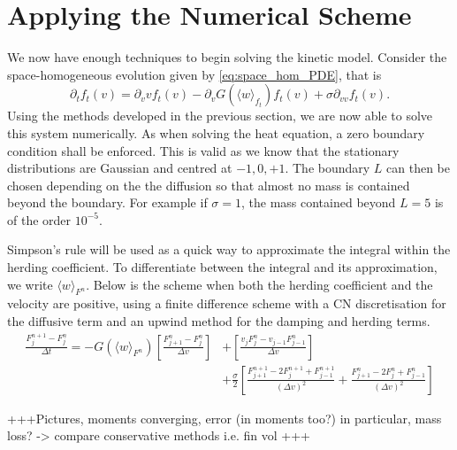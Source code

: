\documentclass[11pt, a4paper, draft]{article}
\begin{document}
		\section{Applying the Numerical Scheme}
			We now have enough techniques to begin solving the kinetic model. Consider the space-homogeneous evolution given by \eqref{eq:space_hom_PDE}, that is
			\begin{equation}
				\partial_t f_t(v) = \partial_v vf_t(v) - \partial_v G(\langle w \rangle_{f_t})f_t(v) + \sigma \partial_{vv} f_t(v).
			\end{equation}
            Using the methods developed in the previous section, we are now able to solve this system numerically. As when solving the heat equation, a zero boundary condition shall be enforced. This is valid as we know that the stationary distributions are Gaussian and centred at $-1,0,+1$. The boundary $L$ can then be chosen depending on the the diffusion so that almost no mass is contained beyond the boundary. For example if $\sigma = 1$, the mass contained beyond $L=5$ is of the order $10^{-5}$. 
            
			Simpson's rule will be used as a quick way to approximate the integral within the herding coefficient. To differentiate between the integral and its approximation, we write \(\langle w\rangle_{F^n}\). Below is the scheme when both the herding coefficient and the velocity are positive, using a finite difference scheme with a CN discretisation for the diffusive term and an upwind method for the damping and herding terms.
			\begin{equation*}
			\begin{split}
				\frac{F_j^{n+1} - F_j^n}{\Delta t} = 	-G(\langle w\rangle_{F^n})\left[ \frac{F^n_{j+1} - F^n_{j}}{\Delta v}\right] &+\left[ \frac{v_{j}F^n_{j} - v_{j-1}F^n_{j-1}}{\Delta v}\right]\\ &+ \frac{\sigma}{2}\left[ \frac{F^{n+1}_{j+1} - 2F^{n+1}_j + F^{n+1}_{j-1}}{(\Delta v)^2} + \frac{F^{n}_{j+1} - 2F^{n}_j + F^{n}_{j-1}}{(\Delta v)^2}\right] 	 
			\end{split}
			\end{equation*}

			+++Pictures, moments converging, error (in moments too?) in particular, mass loss? -> compare conservative methods i.e. fin vol +++
\end{document}
